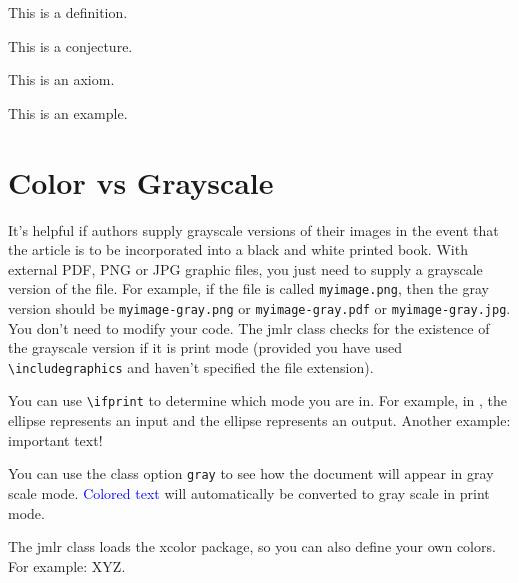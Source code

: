\documentclass[tablecaption=bottom,wcp]{jmlr} %
\begin{document}
\begin{definition}\label{def:sample}
  This is a definition.
\end{definition}

\begin{conjecture}\label{con:sample}
  This is a conjecture.
\end{conjecture}

\begin{axiom}\label{ax:sample}
  This is an axiom.
\end{axiom}

\begin{example}[An Example]\label{ex:sample}
  This is an example.
\end{example}

\section{Color vs Grayscale}
\label{sec:color}

It's helpful if authors supply grayscale versions of their
images in the event that the article is to be incorporated into
a black and white printed book. With external PDF, PNG or JPG
graphic files, you just need to supply a grayscale version of the
file. For example, if the file is called \texttt{myimage.png},
then the gray version should be \texttt{myimage-gray.png} or
\texttt{myimage-gray.pdf} or \texttt{myimage-gray.jpg}. You don't
need to modify your code. The \textsf{jmlr} class checks for
the existence of the grayscale version if it is print mode
(provided you have used \verb|\includegraphics| and haven't
specified the file extension).

You can use \verb|\ifprint| to determine which mode you are in.
For example, in , the
 ellipse represents an input and the
 ellipse represents an output.
Another example: {\ifprint{\bfseries}{\color{red}}important text!}

You can use the class option \texttt{gray} to see how the
document will appear in gray scale mode. \textcolor{blue}{Colored
  text} will automatically be converted to gray scale in print mode.

The \textsf{jmlr} class loads the \textsf{xcolor}
package, so you can also define your own colors. For example:
\ifprint
{}%
{}%
\textcolor{myred}{XYZ}.
\end{document}
